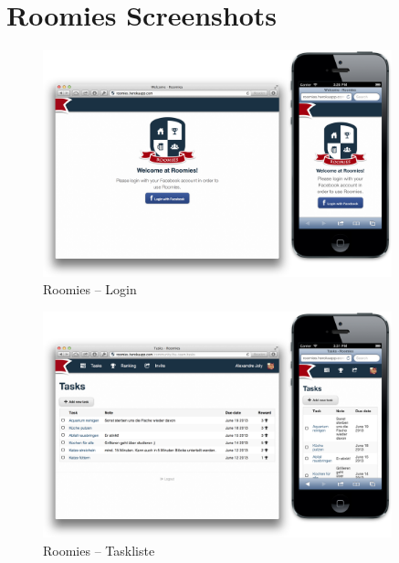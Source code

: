 \chapter{Roomies Screenshots}
\label{sec:roomies-screenshots}

\begin{figure}[H]
	\centering
	\includegraphics[width=0.9\textwidth]{content/appendix/roomies-screenshots/login.png}
	\caption{Roomies -- Login}
	\label{fig:roomies-ss-login}
\end{figure}

\begin{figure}[H]
	\centering
	\includegraphics[width=0.9\textwidth]{content/appendix/roomies-screenshots/task.png}
	\caption{Roomies -- Taskliste}
	\label{fig:roomies-ss-task}
\end{figure}

